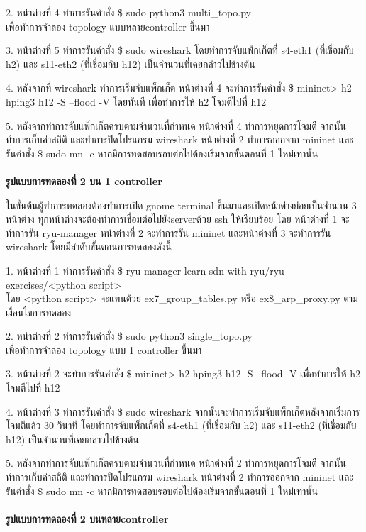 2. หน่าต่างที่ 4 ทำการรันคำสั่ง    
\$ sudo python3 multi\_topo.py \\
เพื่อทำการจำลอง topology แบบหลาย\gls{controller} ขึ้นมา

3. หน้าต่างที่ 5 ทำการรันคำสั่ง 
\$ sudo wireshark 
โดยทำการจับแพ็กเก็ตที่ s4-eth1 (ที่เชื่อมกับ h2) และ s11-eth2 (ที่เชื่อมกับ h12) เป็นจำนวนที่เคยกล่าวไปข้างต้น

4. หลังจากที่ wireshark ทำการเริ่มจับแพ็กเก็ต หน้าต่างที่ 4 จะทำการรันคำสั่ง \$ mininet> h2 hping3 h12 -S --flood -V
โดยทันที เพื่อทำการให้ h2 โจมตีไปที่ h12

5. หลังจากทำการจับแพ็กเก็ตครบตามจำนวนที่กำหนด หน้าต่างที่ 4 ทำการหยุดการโจมตี จากนั้นทำการเก็บค่าสถิติ และทำการปิดโปรแกรม wireshark
หน้าต่างที่ 2 ทำการออกจาก mininet และรันคำสั่ง \$ sudo mn -c หากมีการทดสอบรอบต่อไปต้องเริ่มจากขั้นตอนที่ 1 ใหม่เท่านั้น
\\\\
\textbf{รูปแบบการทดลองที่ 2 บน 1 \gls{controller}}

ในขั้นต้นผู้ทำการทดลองต้องทำการเปิด gnome terminal ขึ้นมาและเปิดหน้าต่างย่อยเป็นจำนวน 3 หน้าต่าง
ทุกหน้าต่างจะต้องทำการเชื่อมต่อไปยัง\gls{server}ด้วย ssh ให้เรียบร้อย
โดย หน้าต่างที่ 1 จะทำการรัน ryu-manager หน้าต่างที่ 2 จะทำการรัน mininet และหน้าต่างที่ 3 จะทำการรัน wireshark
โดยมีลำดับขั้นตอนการทดลองดังนี้


1. หน้าต่างที่ 1 ทำการรันคำสั่ง    
\$ ryu-manager learn-sdn-with-ryu/ryu-exercises/<python script> \\
โดย <python script> จะแทนด้วย ex7\_group\_tables.py หรือ ex8\_arp\_proxy.py ตามเงื่อนไขการทดลอง

2. หน่าต่างที่ 2 ทำการรันคำสั่ง    
\$ sudo python3 single\_topo.py \\
เพื่อทำการจำลอง topology แบบ 1 \gls{controller} ขึ้นมา

3. หน้าต่างที่ 2 จะทำการรันคำสั่ง \$ mininet> h2 hping3 h12 -S --flood -V
เพื่อทำการให้ h2 โจมตีไปที่ h12

4. หน้าต่างที่ 3 ทำการรันคำสั่ง 
\$ sudo wireshark 
จากนั้นจะทำการเริ่มจับแพ็กเก็ตหลังจากเริ่มการโจมตีแล้ว 30 วินาที
โดยทำการจับแพ็กเก็ตที่ s4-eth1 (ที่เชื่อมกับ h2) และ s11-eth2 (ที่เชื่อมกับ h12) เป็นจำนวนที่เคยกล่าวไปข้างต้น


5. หลังจากทำการจับแพ็กเก็ตครบตามจำนวนที่กำหนด หน้าต่างที่ 2 ทำการหยุดการโจมตี จากนั้นทำการเก็บค่าสถิติ และทำการปิดโปรแกรม wireshark
หน้าต่างที่ 2 ทำการออกจาก mininet และรันคำสั่ง \$ sudo mn -c หากมีการทดสอบรอบต่อไปต้องเริ่มจากขั้นตอนที่ 1 ใหม่เท่านั้น
\\\\
\textbf{รูปแบบการทดลองที่ 2 บนหลาย\gls{controller}}

